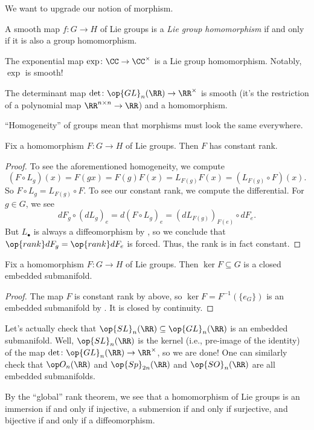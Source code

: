 \documentclass[../notes.tex]{subfiles}
\begin{document}
We want to upgrade our notion of morphism.
\begin{definition}[homomorphism]
	A smooth map $f\colon G\to H$ of Lie groups is a \textit{Lie group homomorphism} if and only if it is also a group homomorphism.
\end{definition}
\begin{example}
	The exponential map $\exp\colon\CC\to\CC^\times$ is a Lie group homomorphism. Notably, $\exp$ is smooth!
\end{example}
\begin{example} \label{ex:det-is-hom}
	The determinant map $\det\colon\op{GL}_n(\RR)\to\RR^\times$ is smooth (it's the restriction of a polynomial map $\RR^{n\times n}\to\RR$) and a homomorphism.
\end{example}
``Homogeneity'' of groups mean that morphisms must look the same everywhere.
\begin{proposition} \label{prop:hom-is-constant-rank}
	Fix a homomorphism $F\colon G\to H$ of Lie groups. Then $F$ has constant rank.
\end{proposition}
\begin{proof}
	To see the aforementioned homogeneity, we compute
	\[(F\circ L_g)(x)=F(gx)=F(g)F(x)=L_{F(g)}F(x)=\left(L_{F(g)}\circ F\right)(x).\]
	So $F\circ L_g=L_{F(g)}\circ F$. To see our constant rank, we compute the differential. For $g\in G$, we see
	\[dF_g\circ(dL_g)_e=d(F\circ L_g)_e=(dL_{F(g)})_{F(e)}\circ dF_e.\]
	But $L_\bullet$ is always a diffeomorphism by , so we conclude that $\op{rank}dF_g=\op{rank}dF_e$ is forced. Thus, the rank is in fact constant.
\end{proof}
\begin{corollary}
	Fix a homomorphism $F\colon G\to H$ of Lie groups. Then $\ker F\subseteq G$ is a closed embedded submanifold.
\end{corollary}
\begin{proof}
	The map $F$ is constant rank by  above, so $\ker F=F^{-1}(\{e_G\})$ is an embedded submanifold by . It is closed by continuity.
\end{proof}
\begin{example} \label{ex:matrix-groups}
	Let's actually check that $\op{SL}_n(\RR)\subseteq\op{GL}_n(\RR)$ is an embedded submanifold. Well, $\op{SL}_n(\RR)$ is the kernel (i.e., pre-image of the identity) of the map $\det\colon\op{GL}_n(\RR)\to\RR^\times$, so we are done! One can similarly check that $\op O_n(\RR)$ and $\op{Sp}_{2n}(\RR)$ and $\op{SO}_n(\RR)$ are all embedded submanifolds.
\end{example}
\begin{remark} \label{rem:rank-theorem-for-lie}
	By the ``global'' rank theorem, we see that a homomorphism of Lie groups is an immersion if and only if injective, a submersion if and only if surjective, and bijective if and only if a diffeomorphism.
\end{remark}
\end{document}
